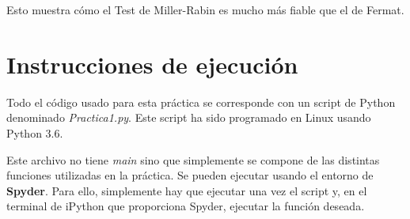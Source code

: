 \documentclass{article}
\begin{document}
	Esto muestra cómo el Test de Miller-Rabin es mucho más fiable que el de
	Fermat.
	
	\section*{\textbf{Instrucciones de ejecución}}

	Todo el código usado para esta práctica se corresponde con un script de Python denominado \emph{Practica1.py}. Este
	script ha sido programado en Linux usando Python 3.6.
	
	Este archivo no tiene \emph{main} sino que simplemente se compone de las distintas funciones utilizadas en la práctica. Se pueden ejecutar usando el entorno de \textbf{Spyder}. Para ello, simplemente hay que ejecutar una vez el script y, en el 	terminal de iPython que proporciona Spyder, ejecutar
la función deseada.	
	
\end{document}
